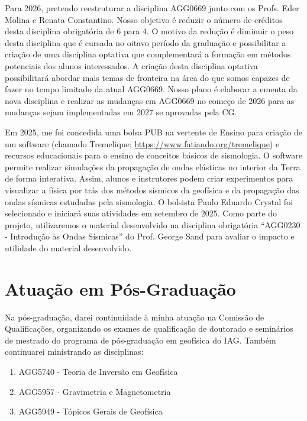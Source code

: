 \documentclass[12pt,a4paper,oneside]{book}
\begin{document}
Para 2026, pretendo reestruturar a disciplina AGG0669 junto com os Profs. Eder
Molina e Renata Constantino. Nosso objetivo é reduzir o número de créditos
desta disciplina obrigatória de 6 para 4. O motivo da redução é diminuir o peso
desta disciplina que é cursada no oitavo período da graduação e possibilitar
a criação de uma disciplina optativa que complementará a formação em métodos
potenciais dos alunos interessados.
A criação desta disciplina optativa possibilitará abordar mais temas de
fronteira na área do que somos capazes de fazer no tempo limitado da atual
AGG0669. Nosso plano é elaborar a ementa da nova disciplina e realizar as
mudanças em AGG0669 no começo de 2026 para as mudanças sejam implementadas em
2027 se aprovadas pela CG.

Em 2025, me foi concedida uma bolsa PUB na vertente de Ensino para
criação de um software (chamado Tremelique; \url{https://www.fatiando.org/tremelique}) e recursos educacionais para o ensino de conceitos
básicos de sismologia.
O software permite realizar simulações da propagação de ondas elásticas no
interior da Terra de forma interativa. Assim, alunos e instrutores podem criar
experimentos para visualizar a física por trás dos métodos sísmicos da
geofísica e da propagação das ondas sísmicas estudadas pela sismologia.
O bolsista Paulo Eduardo Crystal foi selecionado
e iniciará suas atividades em setembro de 2025. Como parte do projeto,
utilizaremos o material desenvolvido na disciplina obrigatória ``AGG0230
- Introdução às Ondas Sísmicas''  do Prof. George Sand para avaliar o impacto
e utilidade do material desenvolvido.

\chapter{Atuação em Pós-Graduação}

Na pós-graduação,
darei continuidade à minha atuação na Comissão de Qualificações,
organizando os exames de qualificação de doutorado e seminários de mestrado do
programa de pós-graduação em geofísica do IAG.
Também continuarei ministrando as disciplinas:

\begin{enumerate}
\item AGG5740 - Teoria de Inversão em Geofísica
\item AGG5957 - Gravimetria e Magnetometria
\item AGG5949 - Tópicos Gerais de Geofísica
\end{enumerate}
\end{document}
